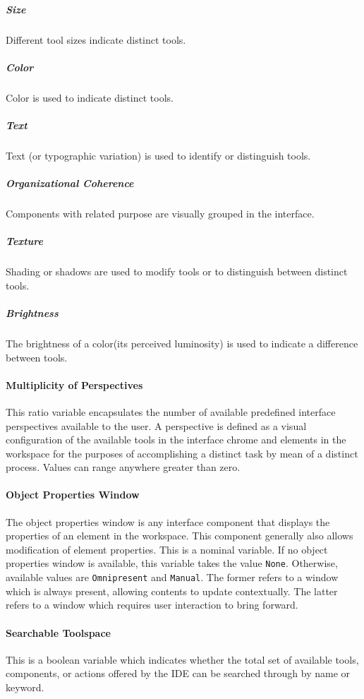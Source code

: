 \subparagraph{Size} Different tool sizes indicate distinct tools.
\cite{moody2009}

\subparagraph{Color} Color is used to indicate distinct tools.
\cite{moody2009}

\subparagraph{Text} Text (or typographic variation) is used to identify or
distinguish tools. \cite{moody2009}

\subparagraph{Organizational Coherence} Components with related purpose are
visually grouped in the interface. \cite{constantine1996}

\subparagraph{Texture} Shading or shadows are used to modify tools or to
distinguish between distinct tools. \cite{moody2009}

\subparagraph{Brightness} The brightness of a color(\ie its perceived
luminosity) is used to indicate a difference between tools.
\cite{moody2009}


\paragraph{Multiplicity of Perspectives} This ratio variable encapsulates
the number of available predefined interface perspectives available to the
user. A perspective is defined as a visual configuration of the available
tools in the interface chrome and elements in the workspace for the
purposes of accomplishing a distinct task by mean of a distinct process.
Values can range anywhere greater than zero.


\paragraph{Object Properties Window} The object properties window is any
interface component that displays the properties of an element in the
workspace. This component generally also allows modification of element
properties. This is a nominal variable. If no object properties window is
available, this variable takes the value \texttt{None}. Otherwise,
available values are \texttt{Omnipresent} and \texttt{Manual}. The former
refers to a window which is always present, allowing contents to update
contextually. The latter refers to a window which requires user interaction
to bring forward.


\paragraph{Searchable Toolspace} This is a boolean variable which indicates
whether the total set of available tools, components, or actions offered by
the IDE can be searched through by name or keyword.


